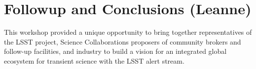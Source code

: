 \section{Followup and Conclusions (Leanne)} \label{sec:conclusions}

 This workshop provided a unique opportunity to bring together representatives of the LSST project, Science Collaborations proposers of community brokers and follow-up facilities, and industry to build a vision for an integrated global ecosystem for transient science with the LSST alert stream.
 
 
